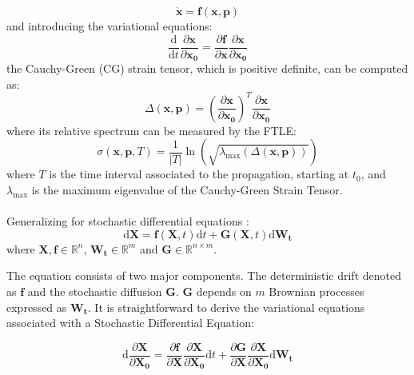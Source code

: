 \documentclass{juliacon}
\newcommand{\drv}{\textrm{d}}
\begin{document}
\begin{equation}
    \dot{\mathbf{x}}=\mathbf{f}(\mathbf{x}, \mathbf{p})
\end{equation}
and introducing the variational equations:
\begin{equation}
    \frac{\drv}{\drv t} \frac{\partial \mathbf{x} }{\partial \mathbf{x_0}} = \frac{\partial \mathbf{f}}{\partial \mathbf{x}}\frac{\partial \mathbf{x}}{\partial \mathbf{x_0}}
\end{equation}
the Cauchy-Green (CG) strain tensor, which is positive definite, can be computed as:
\begin{equation}
    \Delta(\mathbf{x}, \mathbf{p}) = \left( \frac{\partial \mathbf{x}}{\partial \mathbf{x_0}}\right)^T \frac{\partial \mathbf{x}}{\partial \mathbf{x_0}}
\end{equation}
where its relative spectrum can be measured by the FTLE:
\begin{equation}
    \sigma(\mathbf{x}, \mathbf{p}, T)=\frac{1}{|T|}\ln(\sqrt{\lambda_{\max}(\Delta(\mathbf{x}, \mathbf{p}))})
\end{equation}
where $T$ is the time interval associated to the propagation, starting at $t_0$, and $\lambda_{\max}$ is the maximum eigenvalue of the Cauchy-Green Strain Tensor.
\\ \\
Generalizing for stochastic differential equations \cite{oksendal}:
\begin{equation}
    \drv \mathbf{X}=\mathbf{f}(\mathbf{X},t) \drv t + \mathbf{G}(\mathbf{X},t) \drv \mathbf{W_t}
\end{equation}
where $
   \mathbf{X},\mathbf{f} \in \mathbb{R}^{n} 
$,
$
    \mathbf{W_t} \in \mathbb{R}^{m}
$ and
$
    \mathbf{G} \in \mathbb{R}^{n \times m}
$.

The equation consists of two major components. The deterministic drift denoted as $\mathbf{f}$ and the stochastic diffusion $\mathbf{G}$. $\mathbf{G}$ depends on $m$ Brownian processes expressed as $\mathbf{W_t}$. 
It is straightforward to derive the variational equations associated with a Stochastic Differential Equation:

\begin{equation}
\drv \frac{\partial \mathbf{X}}{\partial \mathbf{X_0}}=
\frac{\partial \mathbf{f}}{\partial \mathbf{X}}
\frac{\partial \mathbf{X}}{\partial \mathbf{X_0}} \drv t
+
\frac{\partial \mathbf{G}}{\partial \mathbf{X}}
\frac{\partial \mathbf{X}}{\partial \mathbf{X_0}} \drv \mathbf{W_t}
\end{equation}
\end{document}
